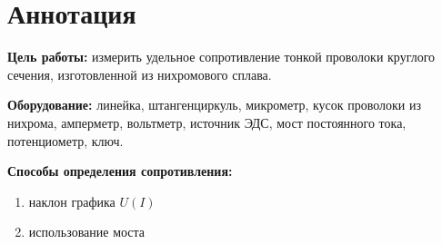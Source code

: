 \section{Аннотация}
\textbf{Цель работы:} измерить удельное сопротивление тонкой проволоки круглого
сечения, изготовленной из нихромового сплава.

\textbf{Оборудование:} линейка, штангенциркуль, микрометр, кусок проволоки из
нихрома, амперметр, вольтметр, источник ЭДС, мост постоянного тока,
потенциометр, ключ.

\textbf{Способы определения сопротивления:}
\begin{enumerate}
    \item наклон графика $U(I)$
    \item использование моста
\end{enumerate}

